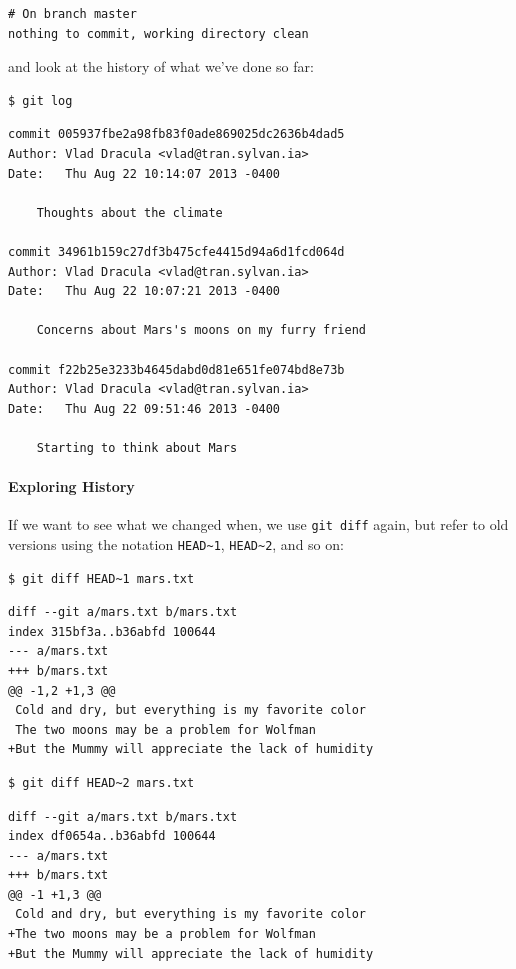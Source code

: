 \documentclass{book}
\begin{document}
\begin{verbatim}
# On branch master
nothing to commit, working directory clean
\end{verbatim}

and look at the history of what we've done so far:

\begin{verbatim}
$ git log
\end{verbatim}

\begin{verbatim}
commit 005937fbe2a98fb83f0ade869025dc2636b4dad5
Author: Vlad Dracula <vlad@tran.sylvan.ia>
Date:   Thu Aug 22 10:14:07 2013 -0400

    Thoughts about the climate

commit 34961b159c27df3b475cfe4415d94a6d1fcd064d
Author: Vlad Dracula <vlad@tran.sylvan.ia>
Date:   Thu Aug 22 10:07:21 2013 -0400

    Concerns about Mars's moons on my furry friend

commit f22b25e3233b4645dabd0d81e651fe074bd8e73b
Author: Vlad Dracula <vlad@tran.sylvan.ia>
Date:   Thu Aug 22 09:51:46 2013 -0400

    Starting to think about Mars
\end{verbatim}

\mbox{}\paragraph{Exploring History}

If we want to see what we changed when, we use \texttt{git diff} again,
but refer to old versions using the notation
\texttt{HEAD\textasciitilde{}1}, \texttt{HEAD\textasciitilde{}2}, and so
on:

\begin{verbatim}
$ git diff HEAD~1 mars.txt
\end{verbatim}

\begin{verbatim}
diff --git a/mars.txt b/mars.txt
index 315bf3a..b36abfd 100644
--- a/mars.txt
+++ b/mars.txt
@@ -1,2 +1,3 @@
 Cold and dry, but everything is my favorite color
 The two moons may be a problem for Wolfman
+But the Mummy will appreciate the lack of humidity
\end{verbatim}

\begin{verbatim}
$ git diff HEAD~2 mars.txt
\end{verbatim}

\begin{verbatim}
diff --git a/mars.txt b/mars.txt
index df0654a..b36abfd 100644
--- a/mars.txt
+++ b/mars.txt
@@ -1 +1,3 @@
 Cold and dry, but everything is my favorite color
+The two moons may be a problem for Wolfman
+But the Mummy will appreciate the lack of humidity
\end{verbatim}
\end{document}
